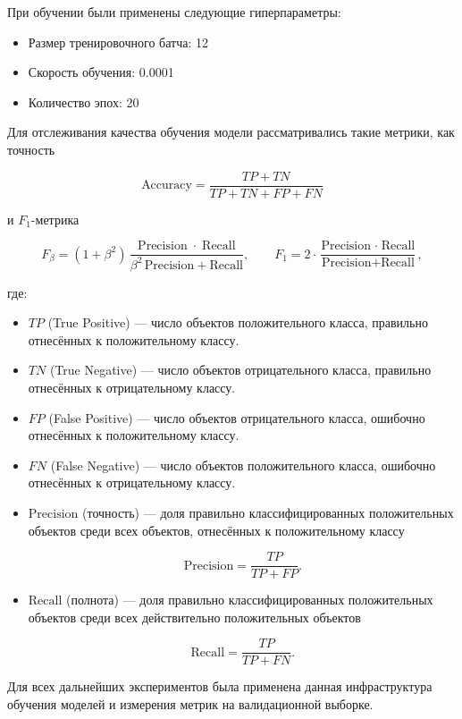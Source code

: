 \documentclass[times,specification,annotation]{itmo-student-thesis}
\begin{document}
При обучении были применены следующие гиперпараметры:

\begin{itemize}
    \item Размер тренировочного батча: 12
    \item Скорость обучения: 0.0001
    \item Количество эпох: 20
\end{itemize}


Для отслеживания качества обучения модели рассматривались такие метрики, как точность

$$
\text{Accuracy} = \frac{TP + TN}{TP + TN + FP + FN}
$$

и $F_1$-метрика

$$
F_\beta = (1 + \beta^2)\,\frac{\mathrm{Precision}\;\cdot\;\mathrm{Recall}}{\beta^2\,\mathrm{Precision} + \mathrm{Recall}}, \qquad  F_1 = 2 \cdot \frac{\text{Precision} \;\cdot\; \text{Recall}}{\text{Precision} + \text{Recall}},
$$

где:

\begin{itemize}
  \item $TP$ (True Positive) — число объектов положительного класса, правильно отнесённых к положительному классу.
  \item $TN$ (True Negative) — число объектов отрицательного класса, правильно отнесённых к отрицательному классу.
  \item $FP$ (False Positive) — число объектов отрицательного класса, ошибочно отнесённых к положительному классу.
  \item $FN$ (False Negative) — число объектов положительного класса, ошибочно отнесённых к отрицательному классу.
  \item $\text{Precision}$ (точность) — доля правильно классифицированных положительных объектов среди всех объектов, отнесённых к положительному классу

    $$
    \text{Precision} = \frac{TP}{TP + FP}.
    $$
  
  \item $\text{Recall}$ (полнота) — доля правильно классифицированных положительных объектов среди всех действительно положительных объектов

    $$
    \text{Recall} = \frac{TP}{TP + FN}.
    $$
\end{itemize}

Для всех дальнейших экспериментов была применена данная инфраструктура обучения моделей и измерения метрик на валидационной выборке.
\end{document}
